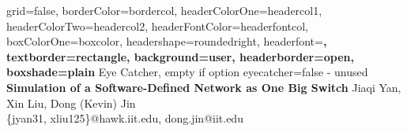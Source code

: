 \documentclass[a0paper,portrait]{baposter}
\begin{document}
\begin{poster}{
	grid=false,
	borderColor=bordercol,
	headerColorOne=headercol1,
	headerColorTwo=headercol2,
	headerFontColor=headerfontcol,
	boxColorOne=boxcolor,
	headershape=roundedright,
	headerfont=\Large\sf\bf,
	textborder=rectangle,
	background=user,
	headerborder=open,
  boxshade=plain
}
{
	Eye Catcher, empty if option eyecatcher=false - unused
}
{\sf\bf
    Simulation of a Software-Defined Network as One Big Switch
}
{
    \vspace{1em} Jiaqi Yan, Xin Liu, Dong (Kevin) Jin\\
    {\smaller \{jyan31, xliu125\}@hawk.iit.edu, dong.jin@iit.edu}
}
{
\setlength\fboxsep{0pt}
\setlength\fboxrule{0.5pt}
}


\end{poster}
\end{document}
